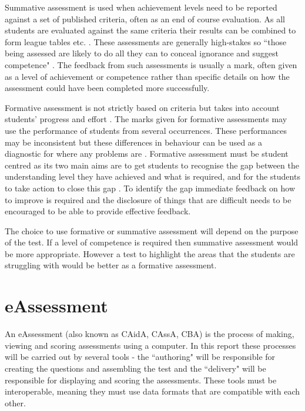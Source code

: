 Summative assessment is used when achievement levels need to be reported against a set of published criteria, often as an end of course evaluation. As all students are evaluated against the same criteria their results can be combined to form league tables etc. \citep{assessmentTypes}. These assessments are generally high-stakes so ``those being assessed are likely to do all they can to conceal ignorance and suggest competence" \citep{knight2001briefing}. The feedback from such assessments is usually a mark, often given as a level of achievement or competence rather than specific details on how the assessment could have been completed more successfully.

Formative assessment is not strictly based on criteria but takes into account students' progress and effort \citep{assessmentTypes}. The marks given for formative assessments may use the performance of students from several occurrences. These performances may be inconsistent but these differences in behaviour can be used as a diagnostic for where any problems are \citep{assessmentTypes}. Formative assessment must be student centred as its two main aims are to get students to recognise the gap between the understanding level they have achieved and what is required, and for the students to take action to close this gap \citep{usesOfAssessment}. To identify the gap immediate feedback on how to improve is required \citep{eps265979} and the disclosure of things that are difficult needs to be encouraged \citep{knight2001briefing} to be able to provide effective feedback. 

The choice to use formative or summative assessment will depend on the purpose of the test. If a level of competence is required then summative assessment would be more appropriate. However a test to highlight the areas that the students are struggling with would be better as a formative assessment.

\section{eAssessment}
An \gls{eAssessment} (also known as \gls{CAidA}, \gls{CAssA}, \gls{CBA}) is the process of making, viewing and scoring assessments using a computer. In this report these processes will be carried out by several tools - the ``\gls{authoring}" will be responsible for creating the questions and assembling the test and the ``\gls{delivery}" will be responsible for displaying and scoring the assessments. These tools must be interoperable, meaning they must use data formats that are compatible with each other.

